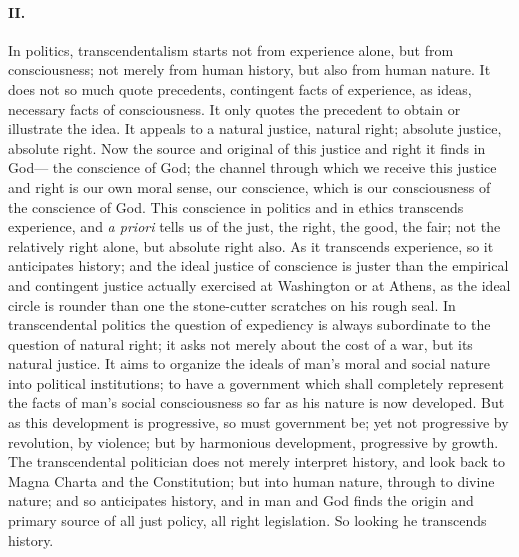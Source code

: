 \documentclass[12pt]{article}
\begin{document}
\paragraph{II.} In politics, transcendentalism starts not from experience alone, but from consciousness; not merely from human history, but also from human nature. It does not so much quote precedents, contingent facts of experience, as ideas, necessary facts of consciousness. It only quotes the precedent to obtain or illustrate the idea. It appeals to a natural justice, natural right; absolute justice, absolute right. Now the source and original of this justice and right it finds in God--- the conscience of God; the channel through which we receive this justice and right is our own moral sense, our conscience, which is our consciousness of the conscience of God. This conscience in politics and in ethics transcends experience, and \emph{a priori} tells us of the just, the right, the good, the fair; not the relatively right alone, but absolute right also. As it transcends experience, so it anticipates history; and the ideal justice of conscience is juster than the empirical and contingent justice actually exercised at Washington or at Athens, as the ideal circle is rounder than one the stone-cutter scratches on his rough seal. In transcendental politics the question of expediency is always subordinate to the question of natural right; it asks not merely about the cost of a war, but its natural justice. It aims to organize the ideals of man's moral and social nature into political institutions; to have a government which shall completely represent the facts of man's social consciousness so far as his nature is now developed. But as this development is progressive, so must government be; yet not progressive by revolution, by violence; but by harmonious development, progressive by growth. The transcendental politician does not merely interpret history, and look back to Magna Charta and the Constitution; but into human nature, through to divine nature; and so anticipates history, and in man and God finds the origin and primary source of all just policy, all right legislation. So looking he transcends history. 
\end{document}
